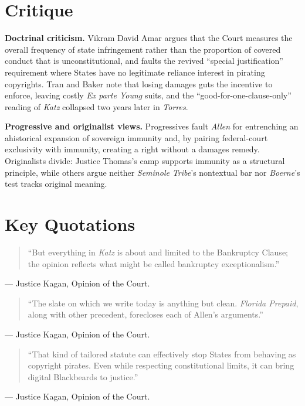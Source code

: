 \documentclass[12pt]{article}
\begin{document}
\section{Critique}

\textbf{Doctrinal criticism.} Vikram David Amar argues that the Court measures the overall frequency of state infringement rather than the proportion of covered conduct that is unconstitutional, and faults the revived ``special justification'' requirement where States have no legitimate reliance interest in pirating copyrights. Tran and Baker note that losing damages guts the incentive to enforce, leaving costly \textit{Ex parte Young} suits, and the ``good-for-one-clause-only'' reading of \textit{Katz} collapsed two years later in \textit{Torres}.

\textbf{Progressive and originalist views.} Progressives fault \textit{Allen} for entrenching an ahistorical expansion of sovereign immunity and, by pairing federal-court exclusivity with immunity, creating a right without a damages remedy. Originalists divide: Justice Thomas's camp supports immunity as a structural principle, while others argue neither \textit{Seminole Tribe}'s nontextual bar nor \textit{Boerne}'s test tracks original meaning.

\section{Key Quotations}

\begin{quote}
``But everything in \textit{Katz} is about and limited to the Bankruptcy Clause; the opinion reflects what might be called bankruptcy exceptionalism.''
\end{quote}
\noindent --- Justice Kagan, Opinion of the Court.

\begin{quote}
``The slate on which we write today is anything but clean. \textit{Florida Prepaid}, along with other precedent, forecloses each of Allen's arguments.''
\end{quote}
\noindent --- Justice Kagan, Opinion of the Court.

\begin{quote}
``That kind of tailored statute can effectively stop States from behaving as copyright pirates. Even while respecting constitutional limits, it can bring digital Blackbeards to justice.''
\end{quote}
\noindent --- Justice Kagan, Opinion of the Court.
\end{document}
